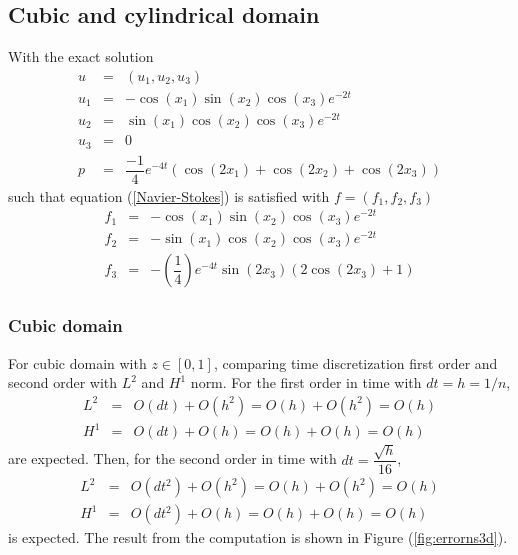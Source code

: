 \documentclass[a4paper]{article}
\begin{document}
\subsection{Cubic and cylindrical domain}
With the exact solution
\begin{eqnarray}\nonumber
u &=& (u_{1},u_{2},u_{3}) \\ \nonumber
u_{1} &=& -\cos(x_{1}) \sin(x_{2}) \cos(x_3) e^{-2t}\\ \nonumber
u_{2} &=& \sin(x_{1}) \cos(x_{2}) \cos(x_3) e^{-2t}\\ \nonumber
u_{3} &=& 0 \\ \nonumber
p&=& \dfrac{-1}{4} e^{-4t} (\cos(2x_1)+\cos(2x_2)+\cos(2x_3))
\end{eqnarray}
such that equation (\ref{Navier-Stokes}) is satisfied with $ f = (f_{1},f_{2},f_3) $
\begin{eqnarray}\nonumber
f_{1} &=& -\cos(x_1) \sin(x_2) \cos(x_3) e^{-2t} \\ \nonumber
f_{2} &=& -\sin(x_1) \cos(x_2) \cos(x_3) e^{-2t} \\ \nonumber
f_{3} &=& -(\dfrac{1}{4})e^{-4t}\sin(2x_3)(2\cos(2x_3)+1)
\end{eqnarray}

\subsubsection{Cubic domain}
For cubic domain with $ z \in [0,1] $, comparing time discretization first order and second order with $ L^{2} $ and $ H^{1} $ norm. For the first order in time with $ dt = h = 1/n $,
\begin{eqnarray}\nonumber
L^{2} &=& O(dt) + O(h^2) = O(h) + O(h^2) = O(h)\\ \nonumber
H^{1} &=& O(dt) + O(h) = O(h) + O(h) = O(h)
\end{eqnarray}
are expected. Then, for the second order in time with $ dt = \dfrac{\sqrt{h}}{16} $,
\begin{eqnarray}\nonumber
L^{2} &=& O(dt^2) + O(h^2) = O(h) + O(h^2) = O(h)\\ \nonumber
H^{1} &=& O(dt^2) + O(h) = O(h) + O(h) = O(h)
\end{eqnarray}
is expected. The result from the computation is shown in Figure (\ref{fig:errorns3d}).
\end{document}
